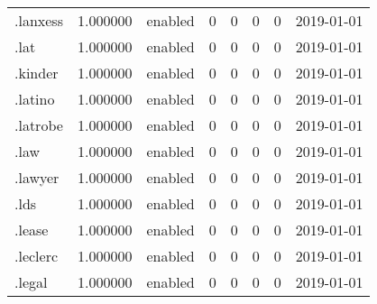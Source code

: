 \begin{tabular}{lrlrrrrl}
.lanxess                  &          1.000000 &         enabled &                           0 &                           0 &                           0 &                   0 &           2019-01-01 \\
.lat                      &          1.000000 &         enabled &                           0 &                           0 &                           0 &                   0 &           2019-01-01 \\
.kinder                   &          1.000000 &         enabled &                           0 &                           0 &                           0 &                   0 &           2019-01-01 \\
.latino                   &          1.000000 &         enabled &                           0 &                           0 &                           0 &                   0 &           2019-01-01 \\
.latrobe                  &          1.000000 &         enabled &                           0 &                           0 &                           0 &                   0 &           2019-01-01 \\
.law                      &          1.000000 &         enabled &                           0 &                           0 &                           0 &                   0 &           2019-01-01 \\
.lawyer                   &          1.000000 &         enabled &                           0 &                           0 &                           0 &                   0 &           2019-01-01 \\
.lds                      &          1.000000 &         enabled &                           0 &                           0 &                           0 &                   0 &           2019-01-01 \\
.lease                    &          1.000000 &         enabled &                           0 &                           0 &                           0 &                   0 &           2019-01-01 \\
.leclerc                  &          1.000000 &         enabled &                           0 &                           0 &                           0 &                   0 &           2019-01-01 \\
.legal                    &          1.000000 &         enabled &                           0 &                           0 &                           0 &                   0 &           2019-01-01 \\

\end{tabular}
